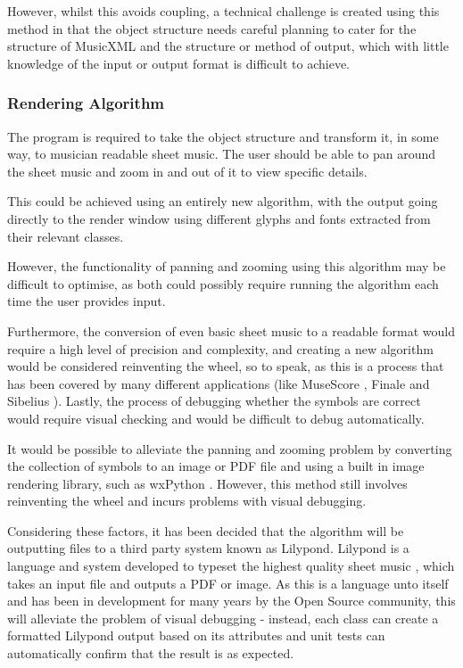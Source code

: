 However, whilst this avoids coupling, a technical challenge is created using this method in that the object structure needs careful planning to cater for the structure of MusicXML and the structure or method of output, which with little knowledge of the input or output format is difficult to achieve.

\subsubsection{Rendering Algorithm}
The program is required to take the object structure and transform it, in some way, to musician readable sheet music. The user should be able to pan around the sheet music and zoom in and out of it to view specific details.

This could be achieved using an entirely new algorithm, with the output going directly to the render window using different glyphs and fonts extracted from their relevant classes.

However, the functionality of panning and zooming using this algorithm may be difficult to optimise, as both could possibly require running the algorithm each time the user provides input. 

Furthermore, the conversion of even basic sheet music to a readable format would require a high level of precision and complexity, and creating a new algorithm would be considered reinventing the wheel, so to speak, as this is a process that has been covered by many different applications (like MuseScore \parencite{MuseTour}, Finale \parencite{mxml} and Sibelius \parencite{avid}). 
Lastly, the process of debugging whether the symbols are correct would require visual checking and would be difficult to debug automatically.

It would be possible to alleviate the panning and zooming problem by converting the collection of symbols to an image or PDF file and using a built in image rendering library, such as wxPython \parencite{WX}. However, this method still involves reinventing the wheel and incurs problems with visual debugging.

Considering these factors, it has been decided that the algorithm will be outputting files to a third party system known as Lilypond. Lilypond is a language and system developed to typeset the highest quality sheet music \parencite{Lilypond}, which takes an input file and outputs a PDF or image. As this is a language unto itself and has been in development for many years by the Open Source community, this will alleviate the problem of visual debugging - instead, each class can create a formatted Lilypond output based on its attributes and unit tests can automatically confirm that the result is as expected.

